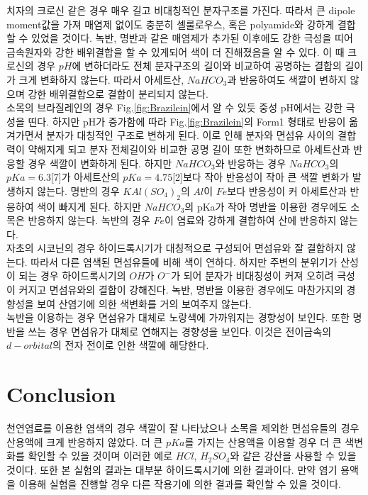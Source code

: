 \documentclass[%
 reprint,
 amsmath,amssymb,
 aps,
]{revtex4-2}
\begin{document}
치자의 크로신 같은 경우 매우 길고 비대칭적인 분자구조를 가진다. 따라서 큰 dipole moment값을 가져 매염제 없이도 충분히 셀룰로우스, 혹은 polyamide와 강하게 결합할 수 있었을 것이다. 녹반, 명반과 같은 매염제가 추가된 이후에도 강한 극성을 띠어 금속원자와 강한 배위결합을 할 수 있게되어 색이 더 진해졌음을 알 수 있다. 이 때 크로신의 경우 $pH$에 변하더라도 전체 분자구조의 길이와 비교하여 공명하는 결합의 길이가 크게 변화하지 않는다. 따라서 아세트산, $NaHCO_{3}$과 반응하여도 색깔이 변하지 않으며 강한 배위결합으로 결합이 분리되지 않는다.\\

소목의 브라질레인의 경우 Fig.\ref{fig:Brazilein}에서 알 수 있듯 중성 pH에서는 강한 극성을 띤다. 하지만 pH가 증가함에 따라 Fig.\ref{fig:Brazilein}의 Form1 형태로 반응이 옮겨가면서 분자가 대칭적인 구조로 변하게 된다. 이로 인해 분자와 면섬유 사이의 결합력이 약해지게 되고 분자 전체길이와 비교한 공명 길이 또한 변화하므로 아세트산과 반응할 경우 색깔이 변화하게 된다. 하지만 $NaHCO_{3}$와 반응하는 경우 $NaHCO_{3}$의 $pKa=6.3$[7]가 아세트산의 $pKa=4.75$[2]보다 작아 반응성이 작아 큰 색깔 변화가 발생하지 않는다. 명반의 경우 $KAl(SO_{4})_{2}$의 $Al$이 $Fe$보다 반응성이 커 아세트산과 반응하여 색이 빠지게 된다. 하지만 $NaHCO_{3}$의 pKa가 작아 명반을 이용한 경우에도 소목은 반응하지 않는다. 녹반의 경우 $Fe$이 염료와 강하게 결합하여 산에 반응하지 않는다. \\

자초의 시코닌의 경우 하이드록시기가 대칭적으로 구성되어 면섬유와 잘 결합하지 않는다. 따라서 다른 염색된 면섬유들에 비해 색이 연하다. 하지만 주변의 분위기가 산성이 되는 경우 하이드록시기의 $OH$가 $O^{-}$가 되어 분자가 비대칭성이 커져 오히려 극성이 커지고 면섬유와의 결합이 강해진다. 녹반, 명반을 이용한 경우에도 마찬가지의 경향성을 보여 산염기에 의한 색변화를 거의 보여주지 않는다. \\

녹반을 이용하는 경우 면섬유가 대체로 노랑색에 가까워지는 경향성이 보인다. 또한 명반을 쓰는 경우 면섬유가 대체로 연해지는 경향성을 보인다. 이것은 전이금속의 $d-orbital$의 전자 전이로 인한 색깔에 해당한다. 

\section{\label{sec:level1}Conclusion}
천연염료를 이용한 염색의 경우 색깔이 잘 나타났으나 소목을 제외한 면섬유들의 경우 산용액에 크게 반응하지 않았다. 더 큰 $pKa$를 가지는 산용액을 이용할 경우 더 큰 색변화를 확인할 수 있을 것이며 이러한 예로 $HCl$, $H_{2}SO_{4}$와 같은 강산을 사용할 수 있을 것이다. 또한 본 실험의 결과는 대부분 하이드록시기에 의한 결과이다. 만약 염기 용액을 이용해 실험을 진행할 경우 다른 작용기에 의한 결과를 확인할 수 있을 것이다.
\end{document}
